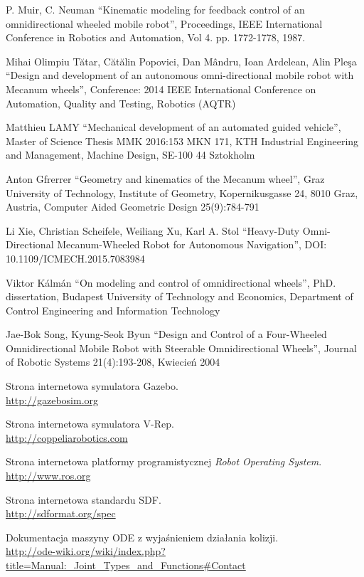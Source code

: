 \begin{thebibliography}{0}

P. Muir, C. Neuman ``Kinematic modeling for feedback control of an omnidirectional wheeled mobile robot'', 
Proceedings, IEEE International Conference in Robotics and Automation, 
Vol 4. pp. 1772-1778, 1987.

Mihai Olimpiu Tătar, Cătălin Popovici, Dan Mândru, Ioan Ardelean, Alin Pleşa ``Design and development of an autonomous omni-directional mobile robot with Mecanum wheels'',
Conference: 2014 IEEE International Conference on Automation, Quality and Testing, Robotics (AQTR)

Matthieu LAMY ``Mechanical development of an automated guided vehicle'',
Master of Science Thesis MMK 2016:153 MKN 171,
KTH Industrial Engineering and Management,
Machine Design,
SE-100 44 Sztokholm

Anton Gfrerrer ``Geometry and kinematics of the Mecanum wheel'',
Graz University of Technology, Institute of Geometry, Kopernikusgasse 24, 8010 Graz, Austria,
Computer Aided Geometric Design 25(9):784-791

Li Xie, Christian Scheifele, Weiliang Xu, Karl A. Stol ``Heavy-Duty Omni-Directional Mecanum-Wheeled Robot for Autonomous Navigation'',
DOI: 10.1109/ICMECH.2015.7083984

Viktor Kálmán ``On modeling and control of omnidirectional wheels'',
PhD. dissertation, Budapest University of Technology and Economics,
Department of Control Engineering and Information Technology

Jae-Bok Song, Kyung-Seok Byun
``Design and Control of a Four-Wheeled Omnidirectional Mobile Robot with Steerable Omnidirectional Wheels'',
Journal of Robotic Systems 21(4):193-208, Kwiecień 2004

Strona internetowa symulatora Gazebo. \\
\url{http://gazebosim.org}

Strona internetowa symulatora V-Rep. \\
\url{http://coppeliarobotics.com}

Strona internetowa platformy programistycznej \emph{Robot Operating System}. \\
\url{http://www.ros.org}

Strona internetowa standardu SDF. \\
\url{http://sdformat.org/spec}

Dokumentacja maszyny ODE z wyjaśnieniem działania kolizji. \\
\url{http://ode-wiki.org/wiki/index.php?title=Manual:_Joint_Types_and_Functions#Contact}

\end{thebibliography}